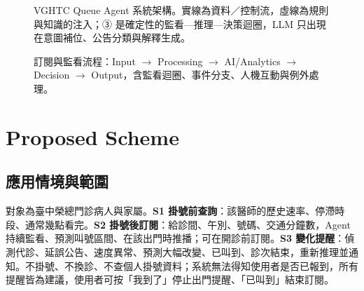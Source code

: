 \documentclass[11pt,twocolumn]{article}
\begin{document}
\begin{figure}[!t]
\centering
{\linespread{1}\selectfont\resizebox{\textwidth}{!}{}}
\caption{VGHTC Queue Agent 系統架構。實線為資料／控制流，虛線為規則與知識的注入；③ 是確定性的監看—推理—決策迴圈，LLM 只出現在意圖補位、公告分類與解釋生成。}
\label{fig:arch}
\end{figure}

\begin{figure}[!t]
\centering
{\linespread{1}\selectfont\resizebox{\textwidth}{!}{}}
\caption{訂閱與監看流程：Input $\rightarrow$ Processing $\rightarrow$ AI/Analytics $\rightarrow$ Decision $\rightarrow$ Output，含監看迴圈、事件分支、人機互動與例外處理。}
\label{fig:flow}
\end{figure}

\section{Proposed Scheme}

\subsection{應用情境與範圍}
對象為臺中榮總門診病人與家屬。\textbf{S1 掛號前查詢}：該醫師的歷史速率、停滯時段、通常幾點看完。\textbf{S2 掛號後訂閱}：給診間、午別、號碼、交通分鐘數，Agent 持續監看、預測叫號區間、在該出門時推播；可在開診前訂閱。\textbf{S3 變化提醒}：偵測代診、延誤公告、速度異常、預測大幅改變、已叫到、診次結束，重新推理並通知。不掛號、不換診、不查個人掛號資料；系統無法得知使用者是否已報到，所有提醒皆為建議，使用者可按「我到了」停止出門提醒、「已叫到」結束訂閱。
\end{document}
